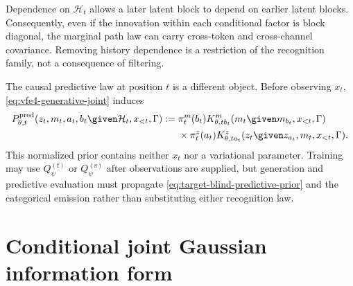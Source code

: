 Dependence on $\mathcal H_t$ allows a later latent block to depend on earlier latent blocks.  Consequently, even if the innovation within each conditional factor is block diagonal, the marginal path law can carry cross-token and cross-channel covariance.  Removing history dependence is a restriction of the recognition family, not a consequence of filtering.

The causal predictive law at position $t$ is a different object.  Before observing $x_t$, \cref{eq:vfe4-generative-joint} induces
\begin{equation}
\begin{aligned}
P_{\theta,t}^{\mathrm{pred}}
(z_t,m_t,a_t,b_t\given\mathcal H_t,x_{<t},\Gamma)
:={}&\pi_t^m(b_t)
K^m_{\theta,tb_t}(m_t\given m_{b_t},x_{<t},\Gamma)\\
&\times\pi_t^z(a_t)
K^z_{\theta,ta_t}(z_t\given z_{a_t},m_t,x_{<t},\Gamma).
\end{aligned}
\label{eq:target-blind-predictive-prior}
\end{equation}
This normalized prior contains neither $x_t$ nor a variational parameter.  Training may use $Q_\psi^{(\mathrm f)}$ or $Q_\psi^{(\mathrm s)}$ after observations are supplied, but generation and predictive evaluation must propagate \cref{eq:target-blind-predictive-prior} and the categorical emission rather than substituting either recognition law.

\section{Conditional joint Gaussian information form}

